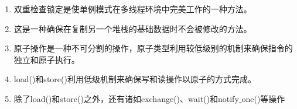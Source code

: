 \begin{enumerate}
	\item 双重检查锁定是使单例模式在多线程环境中完美工作的一种方法。
	\item 这是一种确保在复制另一个堆栈的基础数据时不会被修改的方法。
	\item 原子操作是一种不可分割的操作，原子类型利用较低级别的机制来确保指令的独立和原子执行。
	\item load()和store()利用低级机制来确保写和读操作以原子的方式完成。
	\item 除了load()和store()之外，还有诸如exchange()、wait()和notify\underline{ }one()等操作
\end{enumerate}












